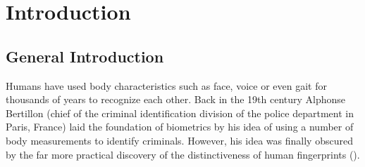 \chapter{Introduction}
\label{introduction}



\section{General Introduction}
Humans have used body characteristics such as face, voice or even gait for thousands of years to recognize each other. Back in the 19th century Alphonse Bertillon (chief of the criminal identification division of the police department in Paris, France) laid the foundation of biometrics by his idea of using a number of body measurements to identify criminals. However, his idea was finally obscured by the far more practical discovery of the distinctiveness of human fingerprints (\cite{jain_biometrics}).


